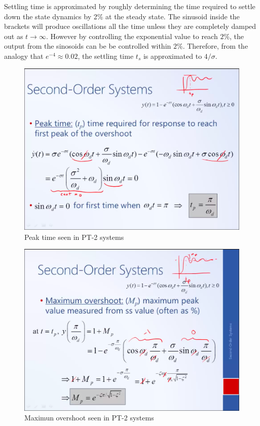 Settling time is approximated by roughly determining the time required to settle down the state dynamics by 2\% at the steady state. The sinusoid inside the brackets will produce oscillations all the time unless they are completely damped out as $t \rightarrow \infty$. However by controlling the exponential value to reach $2\%$, the output from the sinosoids can be be controlled within $2\%$. Therefore, from the analogy that $e^{-4} \approx 0.02$, the settling time $t_s$ is approximated to $4 / \sigma$.
\begin{figure}[h!]
	\centering
	\includegraphics[width=\linewidth]{Bilder/Peak_time_PT2}
	\caption{Peak time seen in PT-2 systems}
	\label{Peak_time_PT2}	
\end{figure}
\begin{figure}[h!]
	\centering
	\includegraphics[width=\linewidth]{Bilder/Max_overshoot_PT2}
	\caption{Maximun overshoot seen in PT-2 systems}
	\label{Max_overshoot_PT2}	
\end{figure}


